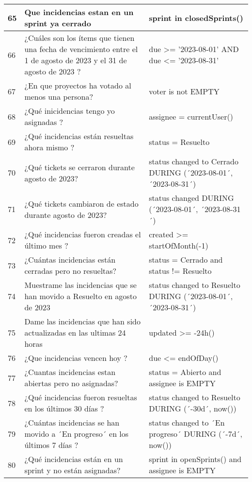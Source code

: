 \begin{center}
\begin{longtable}{ | p{1cm} | p{8cm} | p{6cm} | }
        \hline
        65 & Que incidencias estan en un sprint ya cerrado & sprint in closedSprints() \\
        \hline
        66 & ¿Cuáles son los ítems que tienen una fecha de vencimiento entre el 1 de agosto de 2023 y el 31 de agosto de 2023 ? & due >= '2023-08-01' AND due <= '2023-08-31' \\
        \hline
        67 & ¿En que proyectos ha votado al menos una persona? & voter is not EMPTY \\
        \hline
        68 & ¿Qué inicidencias tengo yo asignadas ? & assignee = currentUser() \\
        \hline
        69 & ¿Qué incidencias están resueltas ahora mismo ? & status = Resuelto \\
        \hline
        70 & ¿Qué tickets se cerraron durante agosto de 2023? & status changed to Cerrado DURING (´2023-08-01´, ´2023-08-31´) \\
        \hline
        71 & ¿Qué tickets cambiaron de estado durante agosto de 2023? & status changed DURING (´2023-08-01´, ´2023-08-31´) \\
        \hline
        72 & ¿Qué incidencias fueron creadas el último mes ? & created >= startOfMonth(-1) \\
        \hline
        73 & ¿Cuántas incidencias  están cerradas pero no resueltas? & status = Cerrado and status != Resuelto \\
        \hline
        74 & Muestrame las incidencias que se han movido a Resuelto en agosto de 2023 & status changed to Resuelto DURING (´2023-08-01´, ´2023-08-31´) \\
        \hline
        75 & Dame las incidencias que han sido actualizadas en las ultimas 24 horas & updated >= -24h() \\
        \hline
        76 & ¿Que incidencias vencen hoy ? & due <= endOfDay() \\
        \hline
        77 & ¿Cuantas incidencias estan abiertas pero no asignadas? & status = Abierto and assignee is EMPTY \\
        \hline
        78 & ¿Qué incidencias fueron resueltas en los últimos 30 días ? & status changed to Resuelto DURING (´-30d´, now()) \\
        \hline
        79 & ¿Cuántas incidencias se han movido a ´En progreso´ en los últimos 7 días ? & status changed to ´En progreso´ DURING (´-7d´, now()) \\
        \hline
        80 & ¿Qué incidencias  están en un sprint y no están asignadas? & sprint in openSprints() and assignee is EMPTY \\

\end{longtable}
\end{center}
